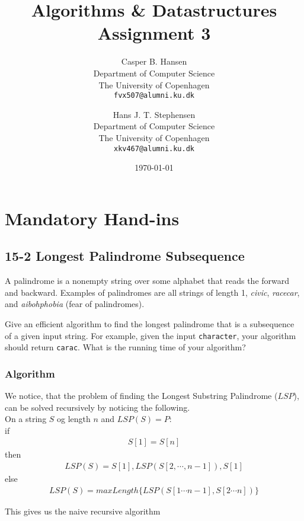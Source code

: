 \documentclass[11pt,english]{article}
\title
{
	\vspace{1in}
	Algorithms \& Datastructures\\
	\huge Assignment 3
}
\author
{
	Casper B. Hansen\\
	\small Department of Computer Science\\
	\small The University of Copenhagen\\
	\texttt{fvx507@alumni.ku.dk}
	\and
	Hans J. T. Stephensen\\
	\small Department of Computer Science\\
	\small The University of Copenhagen\\
	\texttt{xkv467@alumni.ku.dk}
}
\date{\today}
\begin{document}
\clearpage
\maketitle
\thispagestyle{empty}


\newpage
\pagestyle{fancy}

\section*{Mandatory Hand-ins}

\subsection*{15-2 Longest Palindrome Subsequence}
\large{A palindrome is a nonempty string over some alphabet that reads the
forward and backward. Examples of palindromes are all strings of length 1,
\textit{civic}, \textit{racecar}, and \textit{aibohphobia} (fear of
palindromes).

Give an efficient algorithm to find the longest palindrome that is a
subsequence of a given input string. For example, given the input
\texttt{character}, your algorithm should return \texttt{carac}. What is the
running time of your algorithm?}

\subsubsection*{Algorithm}

We notice, that the problem of finding the Longest Substring Palindrome ($LSP$), can be solved recursively by noticing the following. \\
On a string $S$ og length $n$ and $LSP(S) = P$: \\
if
\begin{align*}
S[1] = S[n]
\end{align*}
then
\begin{align*}
LSP(S) = S[1], LSP(S[2, \cdots , n-1]), S[1]
\end{align*}
else
\begin{align*}
LSP(S) = maxLength\{ LSP(S[1 \cdots n-1], S[2 \cdots n]) \}
\end{align*}

\noindent
This gives us the naive recursive algorithm
\end{document}
